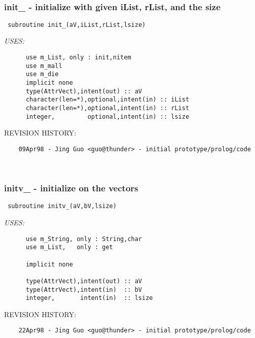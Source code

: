  
\mbox{}\hrulefill\ 
 

 \subsubsection{init\_ - initialize with given iList, rList, and the size}


 
 
\begin{verbatim} 
 subroutine init_(aV,iList,rList,lsize)\end{verbatim}{\em USES:}
\begin{verbatim}      use m_List, only : init,nitem
      use m_mall
      use m_die
      implicit none
      type(AttrVect),intent(out) :: aV
      character(len=*),optional,intent(in) :: iList
      character(len=*),optional,intent(in) :: rList
      integer,         optional,intent(in) :: lsize
 \end{verbatim}{\sf REVISION HISTORY:}
\begin{verbatim}  	09Apr98 - Jing Guo <guo@thunder> - initial prototype/prolog/code\end{verbatim}
 
 
\mbox{}\hrulefill\ 
 

 \subsubsection{initv\_ - initialize on the vectors}


 
 
\begin{verbatim} 
 subroutine initv_(aV,bV,lsize)\end{verbatim}{\em USES:}
\begin{verbatim}      use m_String, only : String,char
      use m_List,   only : get
 
      implicit none
 
      type(AttrVect),intent(out) :: aV
      type(AttrVect),intent(in)  :: bV
      integer,       intent(in)  :: lsize
 \end{verbatim}{\sf REVISION HISTORY:}
\begin{verbatim}  	22Apr98 - Jing Guo <guo@thunder> - initial prototype/prolog/code\end{verbatim}
 
